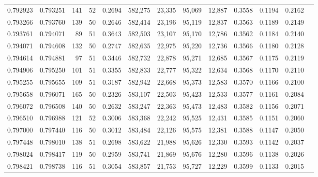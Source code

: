 \begin{tabular}{rrrrrrrrrrrrr}
0.792923 & 0.793251 &   141 &  52 &                                     0.2694 & 582,275 &  23,335 &  95,069 &  12,887 & 0.3558 & 0.1194 & 0.2162 \\
0.793266 & 0.793760 &   139 &  50 &                                     0.2646 & 582,414 &  23,196 &  95,119 &  12,837 & 0.3563 & 0.1189 & 0.2149 \\
0.793761 & 0.794071 &    89 &  51 &                                     0.3643 & 582,503 &  23,107 &  95,170 &  12,786 & 0.3562 & 0.1184 & 0.2140 \\
0.794071 & 0.794608 &   132 &  50 &                                     0.2747 & 582,635 &  22,975 &  95,220 &  12,736 & 0.3566 & 0.1180 & 0.2128 \\
0.794614 & 0.794881 &    97 &  51 &                                     0.3446 & 582,732 &  22,878 &  95,271 &  12,685 & 0.3567 & 0.1175 & 0.2119 \\
0.794906 & 0.795250 &   101 &  51 &                                     0.3355 & 582,833 &  22,777 &  95,322 &  12,634 & 0.3568 & 0.1170 & 0.2110 \\
0.795255 & 0.795655 &   109 &  51 &                                     0.3187 & 582,942 &  22,668 &  95,373 &  12,583 & 0.3570 & 0.1166 & 0.2100 \\
0.795658 & 0.796071 &   165 &  50 &                                     0.2326 & 583,107 &  22,503 &  95,423 &  12,533 & 0.3577 & 0.1161 & 0.2084 \\
0.796072 & 0.796508 &   140 &  50 &                                     0.2632 & 583,247 &  22,363 &  95,473 &  12,483 & 0.3582 & 0.1156 & 0.2071 \\
0.796510 & 0.796988 &   121 &  52 &                                     0.3006 & 583,368 &  22,242 &  95,525 &  12,431 & 0.3585 & 0.1151 & 0.2060 \\
0.797000 & 0.797440 &   116 &  50 &                                     0.3012 & 583,484 &  22,126 &  95,575 &  12,381 & 0.3588 & 0.1147 & 0.2050 \\
0.797448 & 0.798010 &   138 &  51 &                                     0.2698 & 583,622 &  21,988 &  95,626 &  12,330 & 0.3593 & 0.1142 & 0.2037 \\
0.798024 & 0.798417 &   119 &  50 &                                     0.2959 & 583,741 &  21,869 &  95,676 &  12,280 & 0.3596 & 0.1138 & 0.2026 \\
0.798421 & 0.798738 &   116 &  51 &                                     0.3054 & 583,857 &  21,753 &  95,727 &  12,229 & 0.3599 & 0.1133 & 0.2015 \\

\end{tabular}
